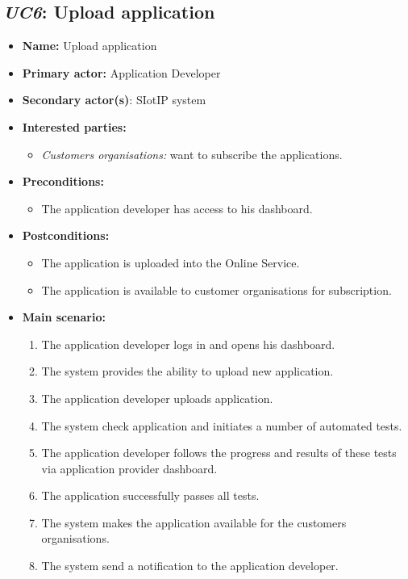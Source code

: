 \subsection{\emph{UC6}: Upload application}
\begin{itemize}
    \item \textbf{Name:} Upload application
    \item \textbf{Primary actor:} Application Developer
    \item \textbf{Secondary actor(s)}: SIotIP system
    \item \textbf{Interested parties:}
        \begin{itemize}
            \item \textit{Customers organisations:} want to subscribe the applications.
        \end{itemize}

    \item \textbf{Preconditions:}
        \begin{itemize}
            \item The application developer has access to his dashboard.
        \end{itemize}

    \item \textbf{Postconditions:}
        \begin{itemize}
            \item The application is uploaded into the Online Service.
            \item The application is available to customer organisations for subscription.
        \end{itemize}

    \item \textbf{Main scenario:}
    \begin{enumerate}
       \item The application developer logs in and opens his dashboard.
       \item The system provides the ability to upload new application.
       \item The application developer uploads application.
       \item The system check application and  initiates a number of automated tests.
       \item The application developer follows  the  progress  and  results
             of these tests via application provider dashboard.
       \item The application successfully passes all tests.
       \item The system makes the application available for the customers organisations.
       \item The system send a notification to the application developer.
    \end{enumerate}


\end{itemize}
